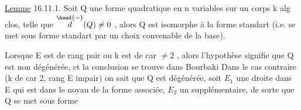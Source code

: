\uline{Lemme} 16.11.1.  Soit Q une forme quadratique en n variables sur un corps k
alg clos, telle que $\overset{\hand{\sim}}{d}(Q)\neq 0$ , alors Q est isomorphe à la forme standart
(i.e. se met sous forme standart par un choix convenable de la base).

Lorsque E est de rang pair ou k est de car $\neq 2$ , alors l'hypothèse
signifie que Q est non dégénérée, et la conclusion se trouve dans Bourbaki
Dans le cas contraire (k de car 2,  rang E impair)  on sait que Q est
dégénérée,  soit $E_1$ une droite dans E qui est dans le noyau de la
forme associée, $E_2$ un supplémentaire, de sorte que Q se met sous forme

